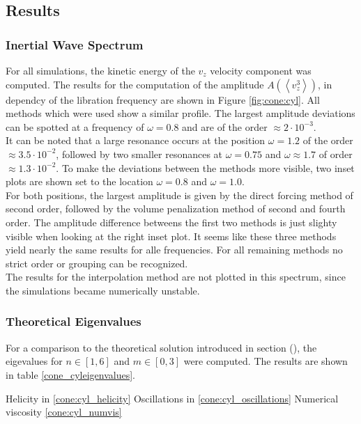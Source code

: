 \subsection{Results}
\subsubsection{Inertial Wave Spectrum}

For all simulations, the kinetic energy of the $v_z$ velocity component was computed.
The results for the computation of the amplitude $A\left(\left<v_z^3\right>\right)$, in dependcy of the libration
frequency are shown in Figure \ref{fig:cone:cyl}.
All methods which were used show a similar profile.
The largest amplitude deviations can be spotted at a frequency of $\omega=0.8$ and are of the order $\approx2\cdot10^{-3}$.\\
It can be noted that a large resonance  occurs at the position $\omega=1.2$ of the order $\approx3.5\cdot10^{-2}$, followed by two
smaller resonances at $\omega=0.75$ and $\omega\approx1.7$ of order $\approx1.3\cdot10^{-2}$.
To make the deviations between the methods more visible, two inset plots are shown
set to the location $\omega=0.8$ and $\omega=1.0$.\\
For both positions, the largest amplitude is given by the direct forcing method of second order, followed by
the volume penalization method of second and fourth order.
The amplitude difference betweens the first two methods is just slighty visible when looking at the right inset plot.
It seems like these three methods yield nearly the same results for alle frequencies.
For all remaining methods  no strict order or grouping can be recognized.\\
The results for the interpolation method are not plotted in this spectrum, since the simulations became numerically unstable.

\subsubsection{Theoretical Eigenvalues}

For a comparison to the theoretical solution introduced in section (),
the eigevalues for $n\in[1,6]$ and $m\in[0, 3]$ were  computed.
The results are shown in table \ref{cone_cyleigenvalues}.

Helicity in          \ref{cone:cyl_helicity}
Oscillations in      \ref{cone:cyl_oscillations}
Numerical viscosity  \ref{cone:cyl_numvis}

